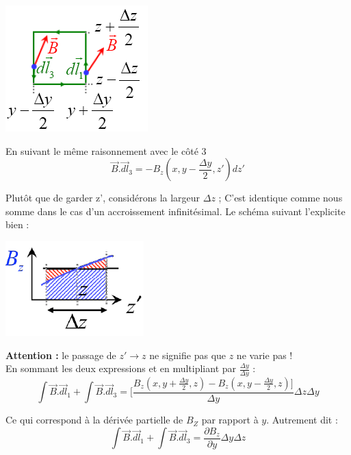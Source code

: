 \documentclass	[11pt, a4paper, openany]{book}
\begin{document}
\begin{center}
	\includegraphics[scale=0.60]{magneto/image17.png}\\
\end{center}
En suivant le même raisonnement avec le côté 3
\begin{equation}
	\vec{B}.\vec{dl}_3 = -B_z(x, y - \frac{\Delta y}{2}, z')dz'
\end{equation}

Plutôt que de garder z', considérons la largeur $\Delta z$ ; C'est identique comme nous somme dans le cas d'un accroissement infinitésimal. Le schéma suivant l'explicite bien :
\begin{center}
	\includegraphics[scale=0.60]{magneto/image18.png}\\
\end{center}

\textbf{Attention :} le passage de $z' \rightarrow z$ ne signifie pas que $z$ ne varie pas !\\

En sommant les deux expressions et en multipliant par $\frac{\Delta y}{\Delta y}$ :
\begin{equation}
	\int \vec{B}.\vec{dl}_1 + \int \vec{B}.\vec{dl}_3 = [\frac{B_z(x, y + \frac{\Delta y}{2}, z)  - B_z(x, y - \frac{\Delta y}{2}, z)]}{\Delta y}\Delta z\Delta y
\end{equation}

Ce qui correspond à la dérivée partielle de $B_Z$ par rapport à $y$. Autrement dit :
\begin{equation}
	\int \vec{B}.\vec{dl}_1 + \int \vec{B}.\vec{dl}_3 = \frac{\partial B_z}{\partial y}\Delta y\Delta z
\end{equation}
\end{document}
